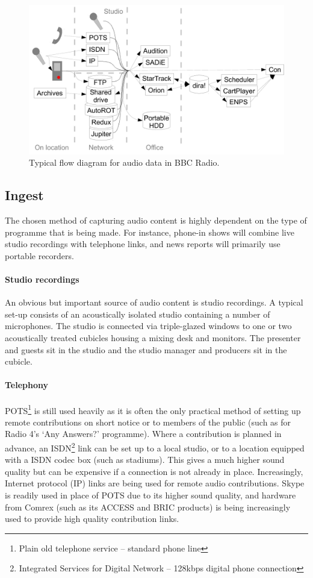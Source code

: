 \begin{figure}[ht]
\centering
\includegraphics[width=\textwidth]{figs/workflow.pdf}
\caption{Typical flow diagram for audio data in BBC Radio.}
\label{fig:workflow}
\end{figure}

\subsection{Ingest}\label{sec:ingest}
The chosen method of capturing audio content is highly dependent on the type of
programme that is being made. For instance, phone-in shows will combine live
studio recordings with telephone links, and news reports will primarily use
portable recorders. 

\paragraph{Studio recordings}
An obvious but important source of audio content is studio recordings. A
typical set-up consists of an acoustically isolated studio containing a number
of microphones. The studio is connected via triple-glazed windows to one or two
acoustically treated cubicles housing a mixing desk and monitors. The presenter
and guests sit in the studio and the studio manager and producers sit in the
cubicle.

\paragraph{Telephony}
POTS\footnote{Plain old telephone service -- standard phone line} is still used
heavily as it is often the only practical method of setting up remote
contributions on short notice or to members of the public (such as for Radio
4's `Any Answers?' programme).  Where a contribution is planned in advance, an
ISDN\footnote{Integrated Services for Digital Network -- 128kbps digital phone
  connection} link can be set up to a local studio, or to a location equipped
with a ISDN codec box (such as stadiums). This gives a much higher sound
quality but can be expensive if a connection is not already in place.
Increasingly, Internet protocol (IP) links are being used for remote audio
contributions.  Skype is readily used in place of POTS due to its higher sound
quality, and hardware from Comrex (such as its ACCESS and BRIC products) is
being increasingly used to provide high quality contribution links.

